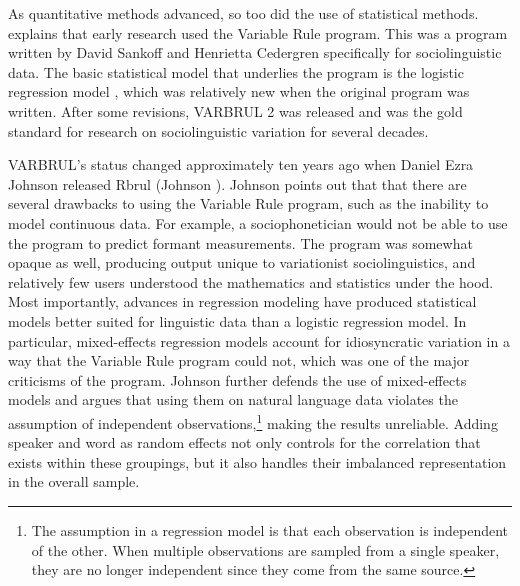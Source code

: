 As quantitative methods advanced, so too did the use of statistical methods. \citet[107--116]{tagliamonte_2016}  explains that early research used the Variable Rule program. This was a program written by David Sankoff and Henrietta Cedergren specifically for sociolinguistic data. The basic statistical model that underlies the program is the logistic regression model \citep{cox_1958}, which was relatively new when the original program was written. After some revisions, VARBRUL 2 \citep{sankoff_1975_varbrul} was released  and was the gold standard for research on sociolinguistic variation for several decades.

VARBRUL’s status changed approximately ten years ago when Daniel Ezra Johnson released Rbrul (Johnson \citeyear{johnson_2009}). Johnson points out that that there are several drawbacks to using the Variable Rule program, such as the inability to model continuous data. For example, a sociophonetician would not be able to use the program to predict formant measurements. The program was somewhat opaque as well, producing output unique to variationist sociolinguistics, and relatively few users understood the mathematics and statistics under the hood. Most importantly, advances in regression modeling have produced statistical models better suited for linguistic data than a logistic regression model. In particular, mixed-effects regression models account for idiosyncratic variation in a way that the Variable Rule program could not, which was one of the major criticisms of the program. Johnson \citeyearpar{johnson_2014} further defends the use of mixed-effects models and argues that using them on natural language data violates the assumption of independent observations,\footnote{The assumption in a regression model is that each observation is independent of the other. When multiple observations are sampled from a single speaker, they are no longer independent since they come from the same source.} making the results unreliable. Adding speaker and word as random effects not only controls for the correlation that exists within these groupings, but it also handles their imbalanced representation in the overall sample.

